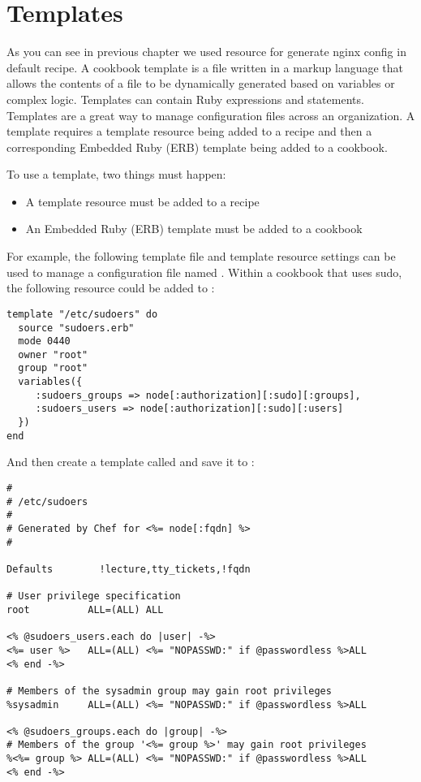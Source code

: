 \section{Templates}

As you can see in previous chapter we used resource  for generate nginx config in default recipe. A cookbook template is a file written in a markup language that allows the contents of a file to be dynamically generated based on variables or complex logic. Templates can contain Ruby expressions and statements. Templates are a great way to manage configuration files across an organization. A template requires a template resource being added to a recipe and then a corresponding Embedded Ruby (ERB) template being added to a cookbook.

To use a template, two things must happen:

\begin{itemize}
  \item A template resource must be added to a recipe
  \item An Embedded Ruby (ERB) template must be added to a cookbook
\end{itemize}

For example, the following template file and template resource settings can be used to manage a configuration file named . Within a cookbook that uses sudo, the following resource could be added to :

\begin{lstlisting}[label=lst:cookbook-templates1]
template "/etc/sudoers" do
  source "sudoers.erb"
  mode 0440
  owner "root"
  group "root"
  variables({
     :sudoers_groups => node[:authorization][:sudo][:groups],
     :sudoers_users => node[:authorization][:sudo][:users]
  })
end
\end{lstlisting}

And then create a template called  and save it to :

\begin{lstlisting}[label=lst:cookbook-templates2]
#
# /etc/sudoers
#
# Generated by Chef for <%= node[:fqdn] %>
#

Defaults        !lecture,tty_tickets,!fqdn

# User privilege specification
root          ALL=(ALL) ALL

<% @sudoers_users.each do |user| -%>
<%= user %>   ALL=(ALL) <%= "NOPASSWD:" if @passwordless %>ALL
<% end -%>

# Members of the sysadmin group may gain root privileges
%sysadmin     ALL=(ALL) <%= "NOPASSWD:" if @passwordless %>ALL

<% @sudoers_groups.each do |group| -%>
# Members of the group '<%= group %>' may gain root privileges
%<%= group %> ALL=(ALL) <%= "NOPASSWD:" if @passwordless %>ALL
<% end -%>
\end{lstlisting}

